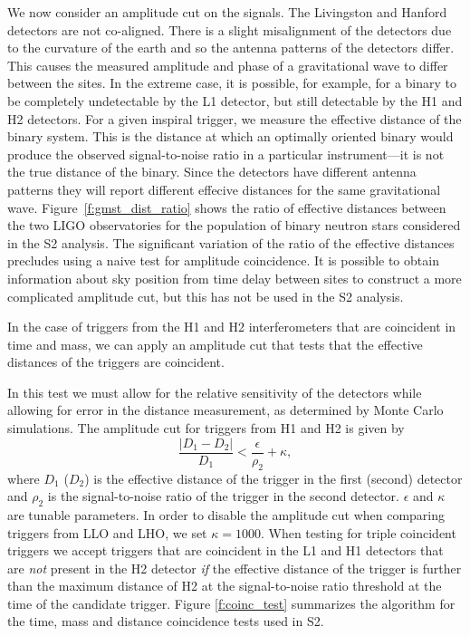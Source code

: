 We now consider an amplitude cut on the signals. The Livingston and Hanford
detectors are not co-aligned. There is a slight misalignment of the detectors
due to the curvature of the earth and so the antenna patterns of the detectors
differ. This causes the measured amplitude and phase of a gravitational wave
to differ between the sites. In the extreme case, it is possible, for example,
for a binary to be completely undetectable by the L1 detector, but still
detectable by the H1 and H2 detectors. For a given inspiral trigger, we
measure the effective distance of the binary system. This is the distance at
which an optimally oriented binary would produce the observed signal-to-noise
ratio in a particular instrument---it is not the true distance of the binary.
Since the detectors have different antenna patterns they will report different
effecive distances for the same gravitational wave.
Figure~\ref{f:gmst_dist_ratio} shows the ratio of effective distances between
the two LIGO observatories for the population of binary neutron stars
considered in the S2 analysis. The significant variation of the ratio of the
effective distances precludes using a naive test for amplitude coincidence. It
is possible to obtain information about sky position from time delay between
sites to construct a more complicated amplitude cut, but this has not be used
in the S2 analysis.

In the case of triggers from the H1 and H2 interferometers that are coincident
in time and mass, we can apply an amplitude cut that tests that the effective
distances of the triggers are coincident. 




In this test we must allow for the
relative sensitivity of the detectors while allowing for error in the distance
measurement, as determined by Monte Carlo simulations. The amplitude cut for
triggers from H1 and H2 is given by 
\begin{equation}
\label{eq:eff_dist_test}
\frac{\left|D_\mathrm{1} - D_\mathrm{2}\right|}{D_\mathrm{1}}
< \frac{\epsilon}{\rho_\mathrm{2}} + \kappa,
\end{equation}
where $D_1$ ($D_2$) is the effective distance of the trigger in the first
(second) detector and $\rho_{2}$ is the signal-to-noise ratio of the trigger
in the second detector. $\epsilon$ and $\kappa$ are tunable parameters.
In order to disable the amplitude cut when comparing triggers from LLO and
LHO, we set $\kappa = 1000$.  When testing for triple coincident triggers we
accept triggers that are coincident in the L1 and H1 detectors that are
\emph{not} present in the H2 detector \emph{if} the effective distance of the
trigger is further than the maximum distance of H2 at the signal-to-noise
ratio threshold at the time of the candidate trigger.  Figure
\ref{f:coinc_test} summarizes the algorithm for the time, mass and distance
coincidence tests used in S2. 

